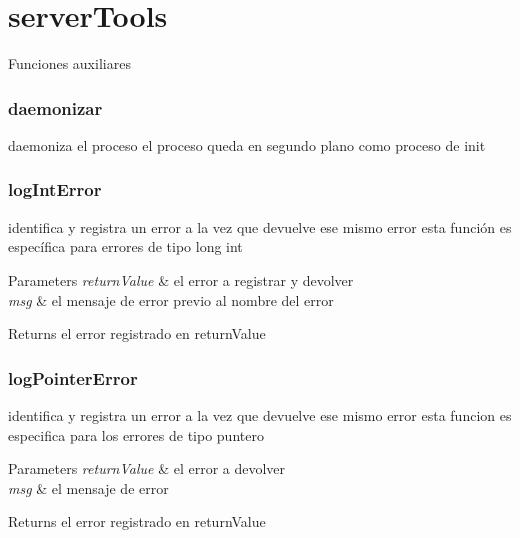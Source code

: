 \hypertarget{group___i_r_c_server_tools}{\section{server\-Tools}
\label{group___i_r_c_server_tools}
}
Funciones auxiliares



 \hypertarget{daemonizar}{}\subsubsection{daemonizar}\label{daemonizar}
daemoniza el proceso el proceso queda en segundo plano como proceso de init



 \hypertarget{logIntError}{}\subsubsection{log\-Int\-Error}\label{logIntError}
identifica y registra un error a la vez que devuelve ese mismo error esta función es específica para errores de tipo long int


\begin{DoxyParams}{Parameters}
{\em return\-Value} & el error a registrar y devolver \\
\hline
{\em msg} & el mensaje de error previo al nombre del error\\
\hline
\end{DoxyParams}
\begin{DoxyReturn}{Returns}
el error registrado en return\-Value
\end{DoxyReturn}


 \hypertarget{logPointerError}{}\subsubsection{log\-Pointer\-Error}\label{logPointerError}
identifica y registra un error a la vez que devuelve ese mismo error esta funcion es especifica para los errores de tipo puntero


\begin{DoxyParams}{Parameters}
{\em return\-Value} & el error a devolver \\
\hline
{\em msg} & el mensaje de error\\
\hline
\end{DoxyParams}
\begin{DoxyReturn}{Returns}
el error registrado en return\-Value
\end{DoxyReturn}


